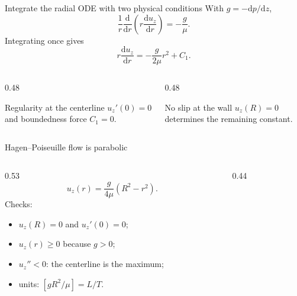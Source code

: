 \documentclass[aspectratio=169,11pt]{beamer}
\begin{document}
\begin{frame}{Integrate the radial ODE with two physical conditions}
With $g=-\mathrm dp/\mathrm dz$,
\[
  \frac1r\frac{\mathrm d}{\mathrm dr}\left(r\frac{\mathrm du_z}{\mathrm dr}\right)
  =-\frac g\mu.
\]
Integrating once gives
\[
  r\frac{\mathrm du_z}{\mathrm dr}=-\frac{g}{2\mu}r^2+C_1.
\]

\begin{columns}[T,onlytextwidth]
\begin{column}{0.48\textwidth}
\begin{block}{Regularity at the centerline}
$u_z'(0)=0$ and boundedness force $C_1=0$.
\end{block}
\end{column}
\begin{column}{0.48\textwidth}
\begin{block}{No slip at the wall}
$u_z(R)=0$ determines the remaining constant.
\end{block}
\end{column}
\end{columns}
\end{frame}

\begin{frame}{Hagen--Poiseuille flow is parabolic}
\begin{columns}[T,onlytextwidth]
\begin{column}{0.53\textwidth}
\[
  \boxed{u_z(r)=\frac{g}{4\mu}(R^2-r^2)}.
\]
Checks:
\begin{itemize}\itemsep4pt
  \item $u_z(R)=0$ and $u_z'(0)=0$;
  \item $u_z(r)\ge0$ because $g>0$;
  \item $u_z''<0$: the centerline is the maximum;
  \item units: $[gR^2/\mu]=L/T$.
\end{itemize}
\end{column}
\begin{column}{0.44\textwidth}
\centering
{}
\end{column}
\end{columns}
\end{frame}
\end{document}
